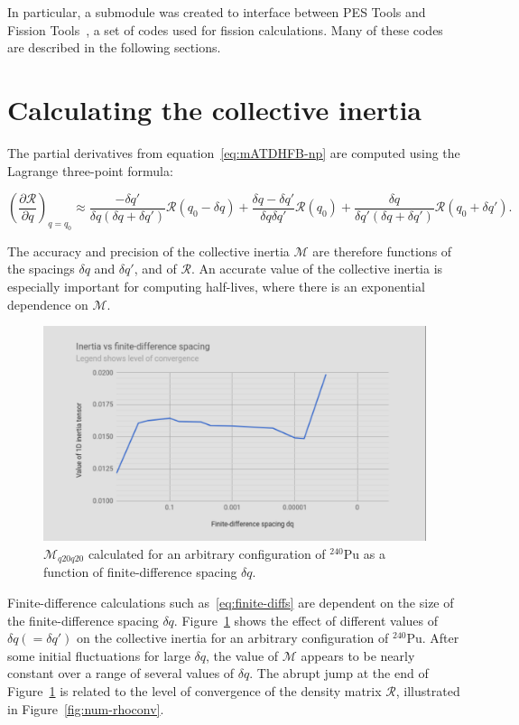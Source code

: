 In particular, a submodule was created to interface between PES Tools and Fission Tools~\cite{fission_tools}, a set of codes used for fission calculations. Many of these codes are described in the following sections.

\section{Calculating the collective inertia}\label{sect:M_numerical}
The partial derivatives from equation~\eqref{eq:mATDHFB-np} are computed using the Lagrange three-point formula:

\begin{equation}\label{eq:finite-diffs}
\left(\frac{\partial \mathcal{R}}{\partial q}\right)_{q=q_0} \approx 
    \frac{-\delta q'}{\delta q \left(\delta q + \delta q'\right)}\mathcal{R}(q_0-\delta q) + 
    \frac{\delta q - \delta q'}{\delta q \delta q'}\mathcal{R}(q_0) + 
    \frac{\delta q}{\delta q' \left(\delta q + \delta q'\right)}\mathcal{R}(q_0+\delta q') .
\end{equation}

\noindent The accuracy and precision of the collective inertia $\mathcal{M}$ are therefore functions of the spacings $\delta q$ and $\delta q'$, and of $\mathcal{R}$. An accurate value of the collective inertia is especially important for computing half-lives, where there is an exponential dependence on $\mathcal{M}$.

\begin{figure}
	\centering
	\includegraphics[width=0.7\linewidth]{TeX_files/Num-dq_spacing}
	\caption[$\mathcal{M}_{q20q20}$ calculated for an arbitrary configuration of $^{240}$Pu as a function of finite-difference spacing $\delta q$.]{$\mathcal{M}_{q20q20}$ calculated for an arbitrary configuration of $^{240}$Pu as a function of finite-difference spacing $\delta q$.}
	\label{fig:num-dqspacing}
\end{figure}

Finite-difference calculations such as~\eqref{eq:finite-diffs} are dependent on the size of the finite-difference spacing $\delta q$. Figure~\ref{fig:num-dqspacing} shows the effect of different values of $\delta q (= \delta q')$ on the collective inertia for an arbitrary configuration of $^{240}$Pu. After some initial fluctuations for large $\delta q$, the value of $\mathcal{M}$ appears to be nearly constant over a range of several values of $\delta q$. The abrupt jump at the end of Figure~\ref{fig:num-dqspacing} is related to the level of convergence of the density matrix $\mathcal{R}$, illustrated in Figure~\ref{fig:num-rhoconv}.

